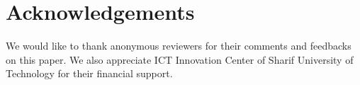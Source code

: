 \section*{Acknowledgements}
We would like to thank anonymous reviewers for their comments and feedbacks on this paper. We also appreciate ICT Innovation Center of Sharif University of Technology for their financial support.